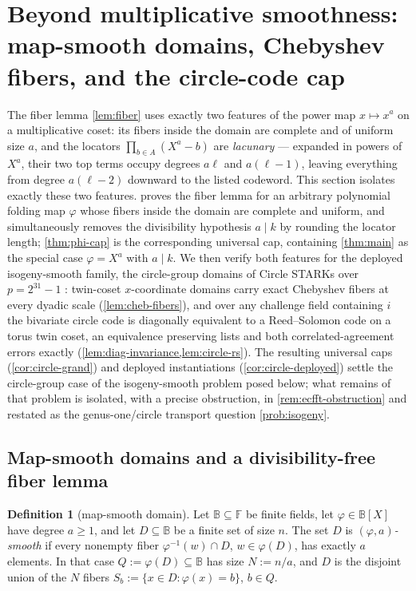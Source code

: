 \documentclass[11pt]{article}
\theoremstyle{definition}
\newtheorem{definition}[definition]{Definition}
\theoremstyle{remark}
\newcommand{\F}{\mathbb{F}}
\newcommand{\B}{\mathbb{B}}
\begin{document}
\section{Beyond multiplicative smoothness: map-smooth domains, Chebyshev fibers, and the circle-code cap}\label{sec:isogeny}

The fiber lemma \cref{lem:fiber} uses exactly two features of the power map $x\mapsto x^a$ on a multiplicative coset: its fibers inside the domain are complete and of uniform size $a$, and the locators $\prod_{b\in A}(X^a-b)$ are \emph{lacunary} --- expanded in powers of $X^a$, their two top terms occupy degrees $a\ell$ and $a(\ell-1)$, leaving everything from degree $a(\ell-2)$ downward to the listed codeword. This section isolates exactly these two features.  proves the fiber lemma for an arbitrary polynomial folding map $\varphi$ whose fibers inside the domain are complete and uniform, and simultaneously removes the divisibility hypothesis $a\mid k$ by rounding the locator length; \cref{thm:phi-cap} is the corresponding universal cap, containing \cref{thm:main} as the special case $\varphi=X^a$ with $a\mid k$. We then verify both features for the deployed isogeny-smooth family, the circle-group domains of Circle STARKs over $p=2^{31}-1$ \cite{HLP24}: twin-coset $x$-coordinate domains carry exact Chebyshev fibers at every dyadic scale (\cref{lem:cheb-fibers}), and over any challenge field containing $i$ the bivariate circle code is diagonally equivalent to a Reed--Solomon code on a torus twin coset, an equivalence preserving lists and both correlated-agreement errors exactly (\cref{lem:diag-invariance,lem:circle-rs}). The resulting universal caps (\cref{cor:circle-grand}) and deployed instantiations (\cref{cor:circle-deployed}) settle the circle-group case of the isogeny-smooth problem posed below; what remains of that problem is isolated, with a precise obstruction, in \cref{rem:ecfft-obstruction} and restated as the genus-one/circle transport question \cref{prob:isogeny}.

\subsection{Map-smooth domains and a divisibility-free fiber lemma}
\label{sec:map-smooth}

\begin{definition}[map-smooth domain]\label{def:map-smooth}
Let $\B\subseteq\F$ be finite fields, let $\varphi\in\B[X]$ have degree $a\ge1$, and let $D\subseteq\B$ be a finite set of size $n$. The set $D$ is \emph{$(\varphi,a)$-smooth} if every nonempty fiber $\varphi^{-1}(w)\cap D$, $w\in\varphi(D)$, has exactly $a$ elements. In that case $Q:=\varphi(D)\subseteq\B$ has size $N:=n/a$, and $D$ is the disjoint union of the $N$ fibers $S_b:=\{x\in D:\varphi(x)=b\}$, $b\in Q$.
\end{definition}
\end{document}
